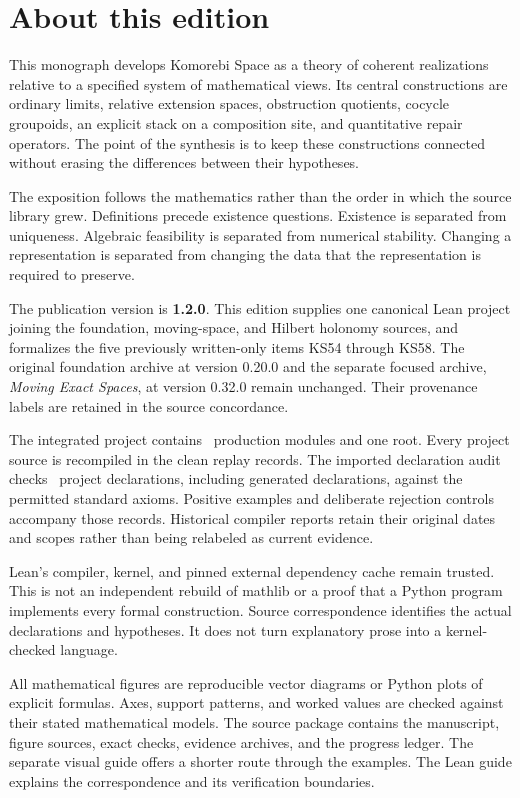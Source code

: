 \documentclass[11pt]{article}
\begin{document}
\KomorebiCover
{}
\section*{About this edition}
This monograph develops Komorebi Space as a theory of coherent realizations relative to a specified system of mathematical views. Its central constructions are ordinary limits, relative extension spaces, obstruction quotients, cocycle groupoids, an explicit stack on a composition site, and quantitative repair operators. The point of the synthesis is to keep these constructions connected without erasing the differences between their hypotheses.

The exposition follows the mathematics rather than the order in which the source library grew. Definitions precede existence questions. Existence is separated from uniqueness. Algebraic feasibility is separated from numerical stability. Changing a representation is separated from changing the data that the representation is required to preserve.

The publication version is \textbf{1.2.0}. This edition supplies one canonical Lean project joining the foundation, moving-space, and Hilbert holonomy sources, and formalizes the five previously written-only items KS54 through KS58. The original foundation archive at version 0.20.0 and the separate focused archive, \emph{Moving Exact Spaces}, at version 0.32.0 remain unchanged. Their provenance labels are retained in the source concordance.

The integrated project contains \EditionFormalModules\ production modules and one root. Every project source is recompiled in the clean replay records. The imported declaration audit checks \EditionAuditedDeclarations\ project declarations, including generated declarations, against the permitted standard axioms. Positive examples and deliberate rejection controls accompany those records. Historical compiler reports retain their original dates and scopes rather than being relabeled as current evidence.

Lean's compiler, kernel, and pinned external dependency cache remain trusted. This is not an independent rebuild of mathlib or a proof that a Python program implements every formal construction. Source correspondence identifies the actual declarations and hypotheses. It does not turn explanatory prose into a kernel-checked language.

All mathematical figures are reproducible vector diagrams or Python plots of explicit formulas. Axes, support patterns, and worked values are checked against their stated mathematical models. The source package contains the manuscript, figure sources, exact checks, evidence archives, and the progress ledger. The separate visual guide offers a shorter route through the examples. The Lean guide explains the correspondence and its verification boundaries.
\end{document}

